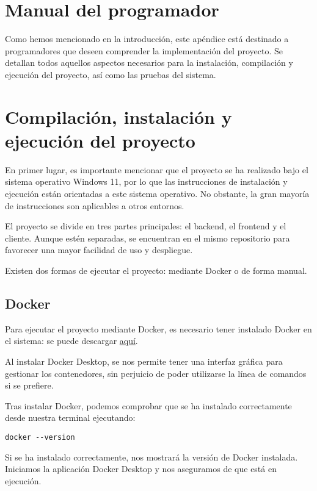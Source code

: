 \section{Manual del programador}

Como hemos mencionado en la introducción, este apéndice está destinado a programadores que deseen comprender la
implementación del proyecto.
Se detallan todos aquellos aspectos necesarios para la instalación, compilación y ejecución del proyecto, así como
las pruebas del sistema.

\section{Compilación, instalación y ejecución del proyecto}

En primer lugar, es importante mencionar que el proyecto se ha realizado bajo el sistema operativo Windows 11, por lo
que las instrucciones de instalación y ejecución están orientadas a este sistema operativo.
No obstante, la gran mayoría de instrucciones son aplicables a otros entornos.

El proyecto se divide en tres partes principales: el backend, el frontend y el cliente.
Aunque estén separadas, se encuentran en el mismo repositorio para favorecer una mayor facilidad de uso y despliegue.

Existen dos formas de ejecutar el proyecto: mediante Docker o de forma manual.

\subsection{Docker}

Para ejecutar el proyecto mediante Docker, es necesario tener instalado Docker en el sistema: se puede descargar
\href{https://www.docker.com/}{aquí}.

Al instalar Docker Desktop, se nos permite tener una interfaz gráfica para gestionar los contenedores, sin perjuicio de poder utilizarse
la línea de comandos si se prefiere.

Tras instalar Docker, podemos comprobar que se ha instalado correctamente desde nuestra terminal ejecutando:
\begin{verbatim}
docker --version
\end{verbatim}

Si se ha instalado correctamente, nos mostrará la versión de Docker instalada.
Iniciamos la aplicación Docker Desktop y nos aseguramos de que está en ejecución.

